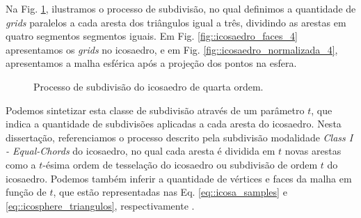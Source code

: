 \documentclass[
    12pt,                %
    oneside,            %
    a4paper,            %
    english,            %
    french,                %
    spanish,            %
    brazil                %
    ]{abntex2}
\begin{document}
Na Fig. \ref{fig::icosaedro_subdivisao_4}, ilustramos o processo de subdivisão, no qual definimos a quantidade de \textit{grids} paralelos a cada aresta dos triângulos igual a três, dividindo as arestas em quatro segmentos segmentos iguais. Em Fig. \ref{fig::icosaedro_faces_4} apresentamos os \textit{grids} no icosaedro, e em Fig. \ref{fig::icosaedro_normalizada_4}, apresentamos a malha esférica após a projeção dos pontos na esfera.

\begin{figure}[ht]
\centering
\captionsetup[subfloat]{farskip=0pt,nearskip=0pt}
\centering
    \hspace{1em}
     \caption{Processo de subdivisão do icosaedro de quarta ordem.}
    \label{fig::icosaedro_subdivisao_4}
\end{figure}

Podemos sintetizar esta classe de subdivisão através de um parâmetro $t$, que indica a quantidade de subdivisões aplicadas a cada aresta do icosaedro. Nesta dissertação, referenciamos o processo descrito pela subdivisão modalidade \textit{Class I - Equal-Chords} do icosaedro, no qual cada aresta é dividida em $t$ novas arestas como a \textsf{$t$-ésima ordem de tesselação do icosaedro} ou \textsf{subdivisão de ordem $t$ do icosaedro}. Podemos também inferir a quantidade de vértices e faces da malha em função de $t$, que estão representadas nas Eq. \ref{eq::icosa_samples} e \ref{eq::icosphere_triangulos}, respectivamente \cite{popko2012}.
\end{document}
